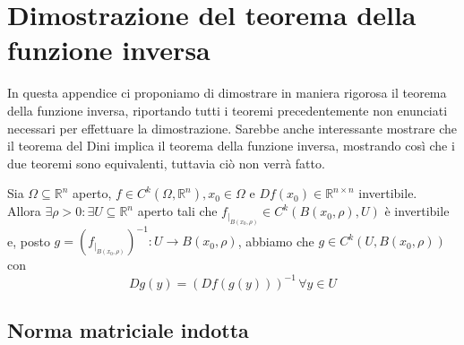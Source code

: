 \chapter{Dimostrazione del teorema della funzione inversa}
\pagestyle{plain}
\thispagestyle{empty}
\pagestyle{fancy}
In questa appendice ci proponiamo di dimostrare in maniera rigorosa il teorema della funzione inversa, riportando tutti i teoremi precedentemente non enunciati necessari per effettuare la dimostrazione. Sarebbe anche interessante mostrare che il teorema del Dini implica il teorema della funzione inversa, mostrando così
che i due teoremi sono equivalenti, tuttavia ciò non verrà fatto.

\begin{theorem}
    Sia $\Omega \subseteq \mathbb{R}^n$ aperto, $f \in C^k(\Omega, \mathbb{R}^n), x_0 \in \Omega$ e $Df(x_0) \in \mathbb{R}^{n \times n}$ invertibile. \\
    Allora $\exists \rho > 0: \exists U \subseteq \mathbb{R}^n$ aperto tali che $f_{|_{B(x_0, \rho)}} \in C^{k}(B(x_0, \rho), U)$ è invertibile e, posto $g=(f_{|_{B(x_0, \rho)}})^{-1}:U \to B(x_0, \rho)$, abbiamo che
    $g \in C^k(U, B(x_0, \rho))$ con
    $$
    Dg(y) = (Df(g(y)))^{-1} \, \forall y \in U
    $$
    \label{thm:inverse_function}
    \end{theorem}

\section{Norma matriciale indotta}


